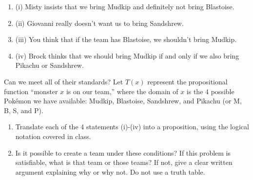 \documentclass[11pt]{amsart}
\newcommand{\be}{\begin{enumerate}}
\newcommand{\ee}{\end{enumerate}}
\begin{document}
	\be
		\item[(i)] Misty insists that we bring Mudkip and definitely not bring Blastoise.
		\item[(ii)] Giovanni really doesn't want us to bring Sandshrew.
		\item[(iii)] You think that if the team has Blastoise, we shouldn't bring Mudkip.
		\item[(iv)] Brock thinks that we should bring Mudkip if and only if we also bring Pikachu or Sandshrew.
	\ee
	

 Can we meet all of their standards?  Let $T(x)$ represent the propositional function ``monster $x$ is on our team,'' where the domain of $x$ is the 4 possible Pok\'emon we have available: Mudkip, Blastoise, Sandshrew, and Pikachu (or M, B, S, and P).	
  
	\be
		\item Translate each of the 4 statements (i)-(iv) into a proposition, using the logical notation covered in class.
		\item Is it possible to create a team under these conditions?  If this problem is satisfiable, what is that team or those teams?  If not, give a clear written argument explaining why or why not.  Do not use a truth table.
	\ee
\end{document}
